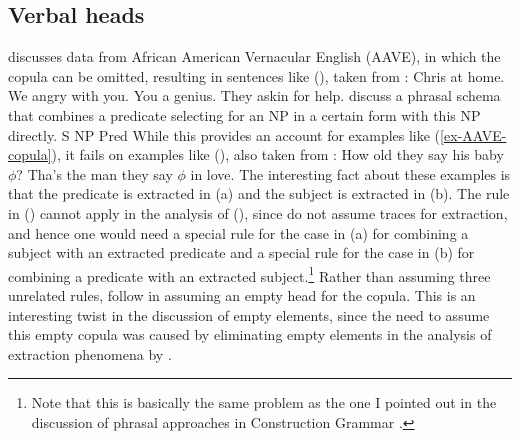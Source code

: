 \documentclass[output=paper
  ,nobabel
  ,draftmode
  ,uniformtopskip %
  ,colorlinks, citecolor=brown
]{langscibook}
\begin{document}



\subsection{Verbal heads}
\label{sec-empty-copula}

\citet{Bender2001a} discusses data from African American Vernacular English (AAVE), in which the
copula can be omitted, resulting in sentences like (), taken from :
\eal
\label{ex-AAVE-copula}
\ex Chris at home.
\ex We angry with you.
\ex You a genius.
\ex They askin for help.
\zl
\citet*[Section~15.3.4]{SWB2003a} discuss a phrasal schema that combines a predicate selecting for an NP
in a certain form with this NP directly. 
\ea
S \to NP Pred
\z
While this provides an account for examples like (\ref{ex-AAVE-copula}), it fails on examples like (), also
taken from :
\eal
\ex How old they say his baby $\phi$?
\ex Tha's the man they say $\phi$ in love.
\zl
The interesting fact about these examples is that the predicate is extracted in (a) and the
subject is extracted in (b). The rule in () cannot apply in the analysis of (),
since \citeauthor{SWB2003a} do not assume traces for extraction, and hence one would need a special
rule for the case in (a) for combining a subject with an extracted predicate and a special
rule for the case in (b) for combining a predicate with an extracted subject.\footnote{
  Note that this is basically the same problem as the one I pointed out in the discussion of phrasal
  approaches in Construction Grammar \citep[]{Mueller2006d}.
}
Rather than assuming three unrelated rules, \citeauthor{SWB2003a} follow \citet{Bender2001a} in
assuming an empty head for the copula. This is an interesting twist in the discussion of empty
elements, since the need to assume this empty copula was caused by eliminating empty elements in the
analysis of extraction phenomena by \citet*{BMS2001a}. 
\end{document}
